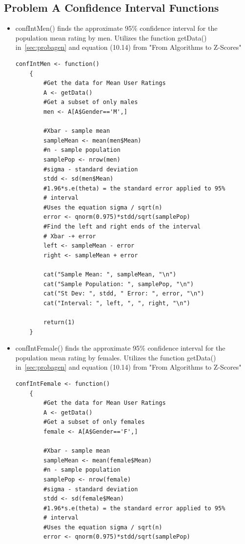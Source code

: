 \documentclass[11pt]{article}  %
\begin{document}
\subsection{Problem A Confidence Interval Functions}
\label{sec:probaconf}
\begin{itemize}

    \label{sec:CIM}
    \item confIntMen() finds the approximate 95\% confidence interval for the population mean rating by men. Utilizes the function getData() in~\ref{sec:probagen} and equation (10.14) from "From Algorithms to Z-Scores"
    \begin{lstlisting}[basicstyle=\small]
    confIntMen <- function()
    {
    	#Get the data for Mean User Ratings
    	A <- getData()
    	#Get a subset of only males
    	men <- A[A$Gender=='M',]
    	
    	#Xbar - sample mean
    	sampleMean <- mean(men$Mean)
    	#n - sample population
    	samplePop <- nrow(men)
    	#sigma - standard deviation
    	stdd <- sd(men$Mean)
    	#1.96*s.e(theta) = the standard error applied to 95%
    	# interval
    	#Uses the equation sigma / sqrt(n)
    	error <- qnorm(0.975)*stdd/sqrt(samplePop)
    	#Find the left and right ends of the interval
    	# Xbar -+ error
    	left <- sampleMean - error
    	right <- sampleMean + error
    
    	cat("Sample Mean: ", sampleMean, "\n")
    	cat("Sample Population: ", samplePop, "\n")
    	cat("St Dev: ", stdd, " Error: ", error, "\n")
    	cat("Interval: ", left, ", ", right, "\n")
    
    	return(1)
    }
    \end{lstlisting}
    
    \label{sec:CIF}
    \item confIntFemale() finds the approximate 95\% confidence interval for the population mean rating by females. Utilizes the function getData() in~\ref{sec:probagen} and equation (10.14) from "From Algorithms to Z-Scores"
    \begin{lstlisting}[basicstyle=\small]
    confIntFemale <- function()
    {
    	#Get the data for Mean User Ratings
    	A <- getData()
    	#Get a subset of only females
    	female <- A[A$Gender=='F',]
    
    	#Xbar - sample mean
    	sampleMean <- mean(female$Mean)
    	#n - sample population
    	samplePop <- nrow(female)
    	#sigma - standard deviation
    	stdd <- sd(female$Mean)
    	#1.96*s.e(theta) = the standard error applied to 95%
    	# interval
    	#Uses the equation sigma / sqrt(n)
    	error <- qnorm(0.975)*stdd/sqrt(samplePop)
    

\end{lstlisting}
\end{itemize}
\end{document}
